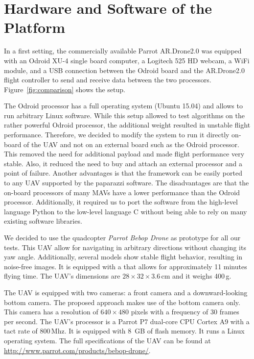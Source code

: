 \DeclareMathOperator*{\argmin}{arg\,min}
\DeclareMathOperator*{\argmax}{arg\,max}

\section{Hardware and Software of the Platform}
\label{sec:hardware}

In a first setting, the commercially available Parrot AR.Drone2.0 was
equipped with an Odroid XU-4 single board computer, a Logitech 525 HD
webcam, a WiFi module, and a USB connection between the Odroid board
and the AR.Drone2.0 flight controller to send and receive data between
the two processors. Figure~\ref{fig:comparison} shows the setup.

The Odroid processor has a full operating system (Ubuntu 15.04) and
allows to run arbitrary Linux software. While this setup allowed to
test algorithms on the rather powerful Odroid processor, the
additional weight resulted in unstable flight performance. Therefore,
we decided to modify the system to run it directly on-board of the UAV
and not on an external board such as the Odroid processor. This
removed the need for additional payload and made flight performance
very stable. Also, it reduced the need to buy and attach an external
processor and a point of failure. Another advantages is that the
framework can be easily ported to any UAV supported by the paparazzi
software. The disadvantages are that the on-board processors of many
MAVs have a lower performance than the Odroid processor. Additionally,
it required us to port the software from the high-level language
Python to the low-level language C without being able to rely on many
existing software libraries.

We decided to use the quadcopter \emph{Parrot Bebop Drone}
as prototype for all our tests. This UAV allow for navigating in
arbitrary directions without changing its yaw angle. Additionally,
several models show stable flight behavior, resulting in noise-free
images. It is equipped with a that allows for approximately 11 minutes
flying time. The UAV's dimensions are $28 \times 32 \times 3.6$\,cm
and it weighs 400\,g.

The UAV is equipped with two cameras: a front camera and a
downward-looking bottom camera. The proposed approach makes use of the
bottom camera only. This camera has a resolution of $640 \times 480$
pixels with a frequency of 30 frames per second. The UAV's processor
is a Parrot P7 dual-core CPU Cortex A9 with a tact rate of
800\,Mhz. It is equipped with 8~GB of flash memory. It runs a Linux
operating system. The full specifications of the UAV can be found at
\url{http://www.parrot.com/products/bebop-drone/}.

